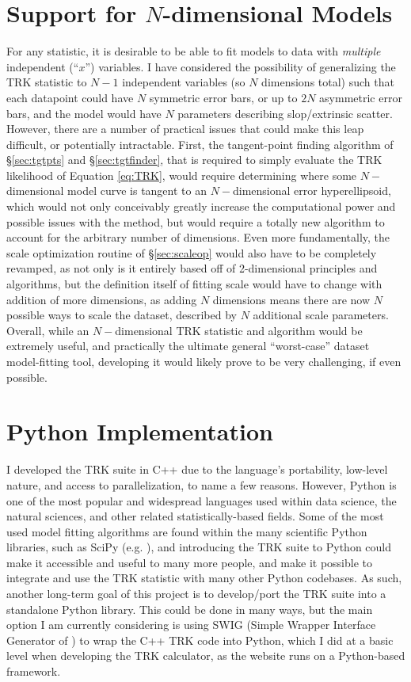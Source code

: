 \section{Support for $N$-dimensional Models}
For any statistic, it is desirable to be able to fit models to data with \textit{multiple} independent (``$x$'') variables. I have considered the possibility of generalizing the TRK statistic to $N-1$ independent variables (so $N$ dimensions total) such that each datapoint could have $N$ symmetric error bars, or up to $2N$ asymmetric error bars, and the model would have $N$ parameters describing slop/extrinsic scatter. However, there are a number of practical issues that could make this leap difficult, or potentially intractable. First, the tangent-point finding algorithm of \S\ref{sec:tgtpts} and \S\ref{sec:tgtfinder}, that is required to simply evaluate the TRK likelihood of Equation \eqref{eq:TRK}, would require determining where some $N-$dimensional model curve is tangent to an $N-$dimensional error hyperellipsoid, which would not only conceivably greatly increase the computational power and possible issues with the method, but would require a totally new algorithm to account for the arbitrary number of dimensions. Even more fundamentally, the scale optimization routine of \S\ref{sec:scaleop} would also have to be completely revamped, as not only is it entirely based off of 2-dimensional principles and algorithms, but the definition itself of fitting scale would have to change with addition of more dimensions, as adding $N$ dimensions means there are now $N$ possible ways to scale the dataset, described by $N$ additional scale parameters. Overall, while an $N-$dimensional TRK statistic and algorithm would be extremely useful, and practically the ultimate general ``worst-case'' dataset model-fitting tool, developing it would likely prove to be very challenging, if even possible.

\section{Python Implementation}
I developed the TRK suite in C++ due to the language's portability, low-level nature, and access to parallelization, to name a few reasons. However, Python is one of the most popular and widespread languages used within data science, the natural sciences, and other related statistically-based fields. Some of the most used model fitting algorithms are found within the many scientific Python libraries, such as SciPy (e.g. \textcite{2020SciPy-NMeth}), and introducing the TRK suite to Python could make it accessible and useful to many more people, and make it possible to integrate and use the TRK statistic with many other Python codebases. As such, another long-term goal of this project is to develop/port the TRK suite into a standalone Python library. This could be done in many ways, but the main option I am currently considering is using SWIG (Simple Wrapper Interface Generator of \textcite{beazley1996swig}) to wrap the C++ TRK code into Python, which I did at a basic level when developing the TRK calculator, as the website runs on a Python-based framework.

